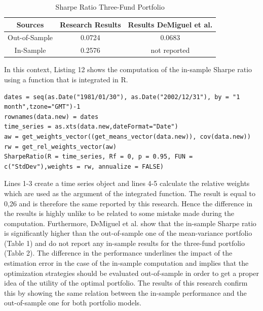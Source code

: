 \documentclass{article}
\begin{document}
\begin{table}[H]
\begin{center}
\begin{tabular}{ccc}
\hline \hline
Sources & Research Results & Results DeMiguel et al. \cite{DEM09}\\
\hline
Out-of-Sample & 0.0724  &  0.0683 \\
In-Sample & 0.2576 & not reported\\
\hline \hline
\end{tabular}
\caption {Sharpe Ratio Three-Fund Portfolio}
\end{center}
\end{table}
In this context, Listing 12 shows the computation of the in-sample Sharpe ratio using a function that is integrated in R.
\begin{lstlisting}[caption={Computation of In-Sample Sharpe ratio using integrated Function in R}, label=code:1, frame=single]
dates = seq(as.Date("1981/01/30"), as.Date("2002/12/31"), by = "1 month",tzone="GMT")-1
rownames(data.new) = dates
time_series = as.xts(data.new,dateFormat="Date")
aw = get_weights_vector((get_means_vector(data.new)), cov(data.new)) 
rw = get_rel_weights_vector(aw)
SharpeRatio(R = time_series, Rf = 0, p = 0.95, FUN = c("StdDev"),weights = rw, annualize = FALSE)
\end{lstlisting}
Lines 1-3 create a time series object and lines 4-5 calculate the relative weights which are used as the argument of the integrated function. The result is equal to 0,26 and is therefore the same reported by this research. Hence the difference in the results is highly unlike to be related to some mistake made during the computation.\endgraf
Furthermore, DeMiguel et al. \cite{DEM09} show that the in-sample Sharpe ratio is significantly higher than the out-of-sample one of the mean-variance portfolio (Table 1) and do not report any in-sample results for the three-fund portfolio (Table 2). The difference in the performance underlines the impact of the estimation error in the case of the in-sample computation and implies that the optimization strategies should be evaluated out-of-sample in order to get a proper idea of the utility of the optimal portfolio. The results of this research confirm this by showing the same relation between the in-sample performance and the out-of-sample one for both portfolio models.
\end{document}

